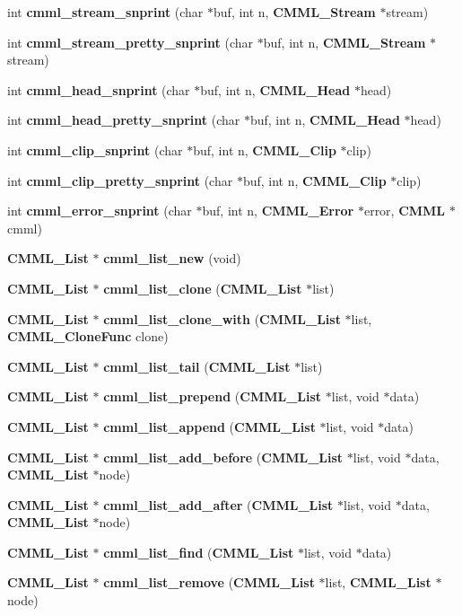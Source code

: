 \begin{CompactItemize}
\item 
int {\bf cmml\_\-stream\_\-snprint} (char $\ast$buf, int n, {\bf CMML\_\-Stream} $\ast$stream)
\item 
int {\bf cmml\_\-stream\_\-pretty\_\-snprint} (char $\ast$buf, int n, {\bf CMML\_\-Stream} $\ast$stream)
\item 
int {\bf cmml\_\-head\_\-snprint} (char $\ast$buf, int n, {\bf CMML\_\-Head} $\ast$head)
\item 
int {\bf cmml\_\-head\_\-pretty\_\-snprint} (char $\ast$buf, int n, {\bf CMML\_\-Head} $\ast$head)
\item 
int {\bf cmml\_\-clip\_\-snprint} (char $\ast$buf, int n, {\bf CMML\_\-Clip} $\ast$clip)
\item 
int {\bf cmml\_\-clip\_\-pretty\_\-snprint} (char $\ast$buf, int n, {\bf CMML\_\-Clip} $\ast$clip)
\item 
int {\bf cmml\_\-error\_\-snprint} (char $\ast$buf, int n, {\bf CMML\_\-Error} $\ast$error, {\bf CMML} $\ast$cmml)
\item 
{\bf CMML\_\-List} $\ast$ {\bf cmml\_\-list\_\-new} (void)
\item 
{\bf CMML\_\-List} $\ast$ {\bf cmml\_\-list\_\-clone} ({\bf CMML\_\-List} $\ast$list)
\item 
{\bf CMML\_\-List} $\ast$ {\bf cmml\_\-list\_\-clone\_\-with} ({\bf CMML\_\-List} $\ast$list, {\bf CMML\_\-Clone\-Func} clone)
\item 
{\bf CMML\_\-List} $\ast$ {\bf cmml\_\-list\_\-tail} ({\bf CMML\_\-List} $\ast$list)
\item 
{\bf CMML\_\-List} $\ast$ {\bf cmml\_\-list\_\-prepend} ({\bf CMML\_\-List} $\ast$list, void $\ast$data)
\item 
{\bf CMML\_\-List} $\ast$ {\bf cmml\_\-list\_\-append} ({\bf CMML\_\-List} $\ast$list, void $\ast$data)
\item 
{\bf CMML\_\-List} $\ast$ {\bf cmml\_\-list\_\-add\_\-before} ({\bf CMML\_\-List} $\ast$list, void $\ast$data, {\bf CMML\_\-List} $\ast$node)
\item 
{\bf CMML\_\-List} $\ast$ {\bf cmml\_\-list\_\-add\_\-after} ({\bf CMML\_\-List} $\ast$list, void $\ast$data, {\bf CMML\_\-List} $\ast$node)
\item 
{\bf CMML\_\-List} $\ast$ {\bf cmml\_\-list\_\-find} ({\bf CMML\_\-List} $\ast$list, void $\ast$data)
\item 
{\bf CMML\_\-List} $\ast$ {\bf cmml\_\-list\_\-remove} ({\bf CMML\_\-List} $\ast$list, {\bf CMML\_\-List} $\ast$node)
\item 

\end{CompactItemize}
